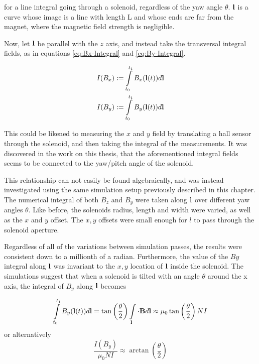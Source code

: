 for a line integral going through a solenoid, regardless of the yaw
angle $\theta$. $\vb{l}$ is a curve whose image
is a line with length L and whose ends are far from the magnet, where
the magnetic field strength is negligible.

Now, let $\vb{l}$ be parallel with the $z$ axis, and instead take the
transversal integral fields, as in equations \ref{eq:Bx-Integral} and
\ref{eq:By-Integral}.

\begin{align}
    I(B_x) & := \int \limits_{t_0}^{t_1} B_x(\vb{l}(t))d\vb{l}
    \label{eq:Bx-Integral}                                 \\
    I(B_y) & := \int \limits_{t_0}^{t_1} B_y(\vb{l}(t))d\vb{l}
    \label{eq:By-Integral}
\end{align}

This could be
likened to measuring the $x$ and $y$ field by translating a hall sensor
through the solenoid, and then taking the integral of the measurements.
It was discovered in the work on this thesis, that the aforementioned
integral fields seems to be connected to the yaw/pitch angle of the
solenoid.

This relationship can not easily
be found algebraically, and was instead investigated using the same
simulation setup previously described in this chapter. The numerical integral of
both $B_z$ and $B_y$ were taken along $\vb{l}$ over different yaw angles $\theta$.
Like before, the solenoids
radius, length and width were varied, as well as the $x$ and $y$ offset.
The $x, y$ offsets were small enough
for $l$ to pass through the solenoid aperture.

Regardless of all of the variations between simulation passes, the results were
consistent down to a millionth of a radian.
Furthermore, the value of the $By$ integral along $\vb{l}$
was invariant to the $x,y$ location of $\vb{l}$ inside the solenoid.
The simulations suggest that when a solenoid is tilted with an angle $\theta$
around the x axis, the integral of $B_y$ along $\vb{l}$ becomes

\begin{equation}
    \int \limits_{t_0}^{t_1} B_y(\vb{l}(t))d\vb{l} =
    \tan\left( \frac{\theta}{2} \right)  \int\limits_{\vb{l}}\cdot\vb{B} d\vb{l}
    \approx \mu_0\tan\left( \frac{\theta}{2} \right) NI
    \label{eq:tanhalf}
\end{equation}
or alternatively
\begin{equation}
    \frac{I(B_y)}{\mu_0NI} \approx \arctan(\frac{\theta}{2})
    \label{eq:Byint-Error}
\end{equation}

